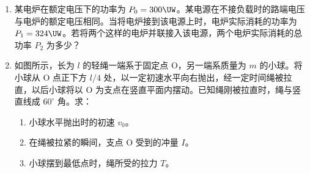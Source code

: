 \documentclass[\gkver]{gaokaozhenti}
\begin{document}
\begin{enumerate}
{$\sin\beta = \sqrt{1 - \sin^{2}\alpha} = \frac{\sqrt{4n^{2} - 3}}{2n}$　　2 分

由折射定律

$n\sin\beta = \sin\gamma$

$\sin\gamma = n\cdot\frac{\sqrt{4n^{2} - 3}}{2n} = \frac{\sqrt{4n^{2} - 3}}{2}$　　2 分

$\delta = \sin^{-1}\frac{\sqrt{4n^{2} - 3}}{2} - 30^{\circ}$　　2 分

（2）要使有光线从 AC 面射出，应有

$\sin\gamma \le 1$

即 $\frac{\sqrt{4n^{2} - 3}}{2} \le 1$　　2 分

得 $n \le \frac{\sqrt{7}}{2}$　　2 分
}

\item
某电炉在额定电压下的功率为 $P_{0} = 300\UW$。某电源在不接负载时的路端电压与电炉的额定电压相同。当将电炉接到该电源上时，电炉实际消耗的功率为 $P_{1} = 324\UW$。若将两个这样的电炉并联接入该电源，两个电炉实际消耗的总功率 $P_{2}$ 为多少？

\item
如图所示，长为 $l$ 的轻绳一端系于固定点 O，另一端系质量为 $m$ 的小球。将小球从 O 点正下方 $l/4$ 处，以一定初速水平向右抛出，经一定时间绳被拉直，以后小球将以 O 为支点在竖直平面内摆动。已知绳刚被拉直时，绳与竖直线成 $60^{\circ}$ 角。求：
\begin{enumerate}
	\item
	小球水平抛出时的初速 $v_{0}$。
	\item
	在绳被拉紧的瞬间，支点 O 受到的冲量 $I$。
	\item
	小球摆到最低点时，绳所受的拉力 $T$。
\end{enumerate}
\onepicture[align=right, w=8cm]{}
\end{enumerate}
\end{document}
